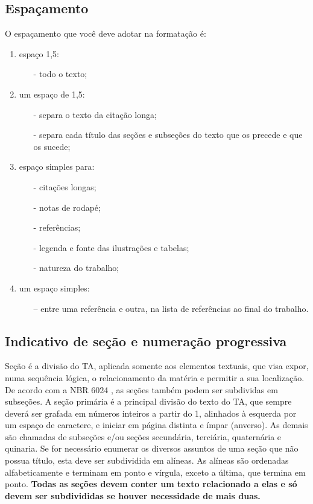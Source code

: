 \subsection{Espaçamento}
O espaçamento que você deve adotar na formatação é:
\begin{enumerate}[label=\alph*)]
\item  espaço 1,5:
\begin{itemize}
\item[-] todo o texto;
\end{itemize}
\item um espaço de 1,5:
\begin{itemize}
\item[-] separa o texto da citação longa;
\item[-] separa cada título das seções e subseções do texto que os precede e que os sucede;
\end{itemize}
\item espaço simples para:
\begin{itemize}
\item[-] citações longas;
\item[-] notas de rodapé;
\item[-] referências;
\item[-] legenda e fonte das ilustrações e tabelas;
\item[-] natureza do trabalho;
\end{itemize}
\item um espaço simples:
\begin{itemize} 
\item[--] entre uma referência e outra, na lista de referências ao final do trabalho.
\end{itemize}
\end{enumerate}



\subsection{Indicativo de seção e numeração progressiva}
Seção é a divisão do TA, aplicada somente aos elementos textuais, que visa expor, numa sequência lógica, o relacionamento da matéria e permitir a sua localização. De acordo com a NBR 6024 \cite{abnt6024}, as seções também podem ser subdividas em subseções.
A seção primária é a principal divisão do texto do TA, que sempre deverá ser grafada em números inteiros a partir do 1, alinhados à esquerda por um espaço de caractere, e iniciar em página distinta e ímpar (anverso). As demais são chamadas de subseções e/ou seções secundária, terciária, quaternária e quinaria. Se for necessário enumerar os diversos assuntos de uma seção que não possua título, esta deve ser subdividida em alíneas. As alíneas são ordenadas alfabeticamente e terminam em ponto e vírgula, exceto a última, que termina em ponto. \textbf{Todas as seções devem conter um texto relacionado a elas e só devem ser subdivididas se houver necessidade de mais duas.}

